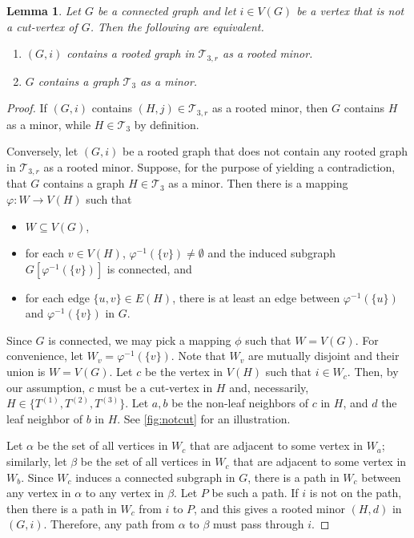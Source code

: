 \documentclass{article}
\newtheorem{lemma}[theorem]{Lemma}
\theoremstyle{definition}
\newcommand{\ttf}{\mathcal{T}_3}
\newcommand{\ttfr}{\mathcal{T}_{3,r}}
\begin{document}
\begin{lemma}
\label{lem:notcut}
Let $G$ be a connected graph and let $i\in V(G)$ be a vertex that is not a cut-vertex of $G$.  Then the following are equivalent.
\begin{enumerate}[label={{\rm(\alph*)}}]
\item $(G,i)$ contains a rooted graph in $\ttfr$ as a rooted minor.
\item $G$ contains a graph $\ttf$ as a minor.
\end{enumerate}
\end{lemma}
\begin{proof}
If $(G,i)$ contains $(H,j)\in\ttfr$ as a rooted minor, then $G$ contains $H$ as a minor, while $H\in\ttf$ by definition.

Conversely, let $(G,i)$ be a rooted graph that does not contain any rooted graph in $\ttfr$ as a rooted minor.  Suppose, for the purpose of yielding a contradiction, that $G$ contains a graph $H\in\ttf$ as a minor.  Then there is a mapping $\varphi: W \rightarrow V(H)$ such that  
\begin{itemize}
\item $W\subseteq V(G)$, 
\item for each $v\in V(H)$, $\varphi^{-1}(\{v\}) \neq \emptyset$ and the induced subgraph $G[\varphi^{-1}(\{v\})]$ is connected, and 
\item for each edge $\{u,v\}\in E(H)$, there is at least an edge between $\varphi^{-1}(\{u\})$ and $\varphi^{-1}(\{v\})$ in $G$.
\end{itemize}
Since $G$ is connected, we may pick a mapping $\phi$ such that $W = V(G)$.  
For convenience, let $W_v = \varphi^{-1}(\{v\})$.  Note that $W_v$ are mutually disjoint and their union is $W = V(G)$.  Let $c$ be the vertex in $V(H)$ such that $i \in W_c$.  Then, by our assumption, $c$ must be a cut-vertex in $H$ and, necessarily, $H\in\{T^{(1)}, T^{(2)}, T^{(3)}\}$.  Let $a,b$ be the non-leaf neighbors of $c$ in $H$, and $d$ the leaf neighbor of $b$ in $H$.  See \cref{fig:notcut} for an illustration.

Let $\alpha$ be the set of all vertices in $W_c$ that are adjacent to some vertex in $W_a$; similarly, let $\beta$ be the set of all vertices in $W_c$ that are adjacent to some vertex in $W_b$.  Since $W_c$ induces a connected subgraph in $G$, there is a path in $W_c$ between any vertex in $\alpha$ to any vertex in $\beta$.  Let $P$ be such a path.  If $i$ is not on the path, then there is a path in $W_c$ from $i$ to $P$, and this gives a rooted minor $(H,d)$ in $(G,i)$.  Therefore, any path from $\alpha$ to $\beta$ must pass through $i$.


\end{proof}
\end{document}
